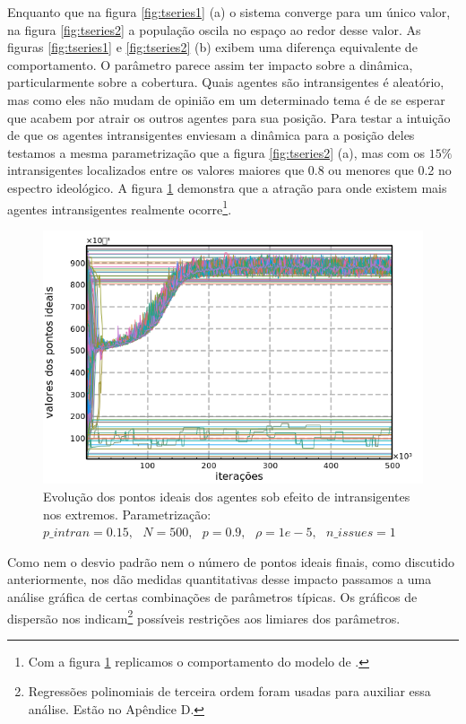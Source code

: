     Enquanto que na figura \ref{fig:tseries1} (a) o sistema converge para um
    único valor, na figura \ref{fig:tseries2} a população oscila no espaço ao
    redor desse valor. As figuras \ref{fig:tseries1} e \ref{fig:tseries2} (b)
    exibem uma diferença equivalente de comportamento. O parâmetro parece assim
    ter impacto sobre a dinâmica, particularmente sobre a cobertura. Quais
    agentes são intransigentes é aleatório, mas como eles não mudam de opinião
    em um determinado tema é de se esperar que acabem por atrair os outros
    agentes para sua posição. Para testar a intuição de que os agentes
    intransigentes enviesam a dinâmica para a posição deles testamos a mesma
    parametrização que a figura \ref{fig:tseries2} (a), mas com os \(15\%\)
    intransigentes localizados entre os valores maiores que 0.8 ou menores que
    0.2 no espectro ideológico. A figura \ref{fig:tseries3} demonstra que a
    atração para onde existem mais agentes intransigentes realmente
    ocorre\footnote{Com a figura \ref{fig:tseries3} replicamos o comportamento
      do modelo de .}.

      \begin{figure}[H]
    \centering
    \includegraphics[scale=0.7]{ims/sigma01extremes.png}
    \caption{ Evolução dos pontos ideais dos agentes sob efeito de
      intransigentes nos extremos. Parametrização: \(p\_intran = 0.15, \text{ }
      N = 500, \text{ } p = 0.9, \text{ } \rho = 1e-5, \text{ } n\_issues = 1 \)}
    \label{fig:tseries3}
  \end{figure}
  

    Como nem o desvio padrão nem o número de pontos ideais finais,
    como discutido anteriormente, nos dão medidas quantitativas desse impacto
    passamos a uma análise gráfica de certas combinações de parâmetros típicas.
    Os gráficos de dispersão nos indicam\footnote{Regressões polinomiais de
      terceira ordem foram usadas para auxiliar essa análise. Estão no
      Apêndice D.} possíveis restrições aos limiares dos parâmetros.

